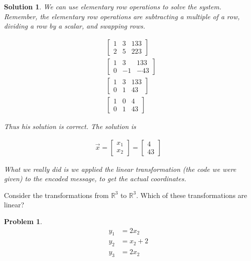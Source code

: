 \documentclass{article}
\newtheorem{problem}{Problem}
\newtheorem*{solution}{Solution}
\begin{document}
\begin{solution}

We can use elementary row operations to solve the system. Remember, the elementary row operations are subtracting a multiple of a row, dividing a row by a scalar, and swapping rows.

\begin{align*}
& \begin{bmatrix}
1 & 3 & 133 \\
2 & 5 & 223
\end{bmatrix} \\
&\begin{bmatrix}
1 & 3 & 133 \\
0 & -1 & -43
\end{bmatrix} \\
& \begin{bmatrix}
1 & 3 & 133 \\
0 & 1 & 43
\end{bmatrix} \\
& \begin{bmatrix}
1 & 0 & 4 \\
0 & 1 & 43
\end{bmatrix}
\end{align*}

Thus his solution is correct. The solution is 

\begin{align*}
\vec{x} = \begin{bmatrix} x_{1} \\ x_{2} \end{bmatrix} = \begin{bmatrix} 4 \\ 43 \end{bmatrix}
\end{align*}

What we really did is we applied the linear transformation (the code we were given) to the encoded message, to get the actual coordinates.

\end{solution}

Consider the transformations from $\mathbb{R}^3$ to $\mathbb{R}^3$. Which of these transformations are linear?

\begin{problem}

\begin{align*}
y_{1} &= 2x_{2} \\
y_{2} &= x_{2} + 2 \\
y_{3} &= 2x_{2}
\end{align*}

\end{problem}
\end{document}
